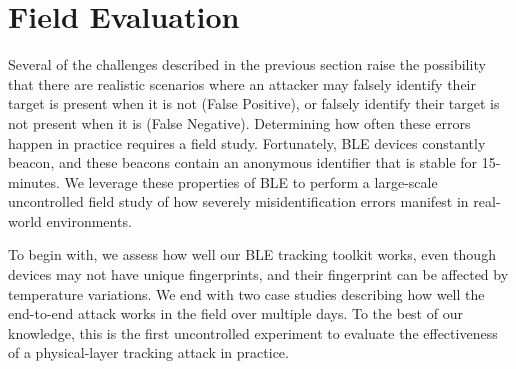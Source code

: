 \section{Field Evaluation}
\label{sec:results}




Several of the challenges described in the previous section raise the
possibility that there are realistic scenarios where an attacker may falsely
identify their target is present when it is not (False Positive), or falsely
identify their target is not present when it is (False Negative). Determining
how often these errors happen in practice requires a field study. Fortunately,
BLE devices constantly beacon, and these beacons contain an anonymous identifier that is stable for 15-minutes. We leverage these properties of BLE to perform a
large-scale uncontrolled field study of how severely
misidentification errors manifest in real-world environments.


To begin with, we assess how well our BLE tracking toolkit works, even though devices
may not have unique fingerprints, and their fingerprint can be affected by
temperature variations. We end with two case studies describing how well the
end-to-end attack works in the field over multiple days. To the best of our
knowledge, this is the first uncontrolled experiment to evaluate the
effectiveness of a physical-layer tracking attack in practice.

